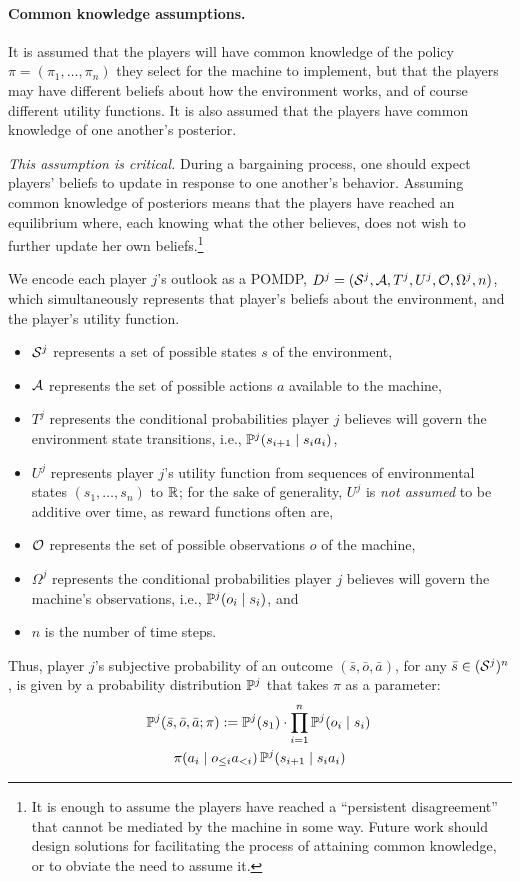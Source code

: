 \documentclass{article}
\newcommand{\seq}{\bar}
\newcommand{\hist}[1]{o_{\le #1}a_{<#1}}
\begin{document}
\paragraph{Common knowledge assumptions.}  It is assumed that the players will have common knowledge of the policy $\pi = (\pi_1,\ldots,\pi_n)$ they select for the machine to implement, but that the players may have different beliefs about how the environment works, and of course different utility functions.  It is also assumed that the players have common knowledge of one another's posterior.  

\emph{This assumption is critical.}  During a bargaining process, one should expect players' beliefs to update in response to one another's behavior.   Assuming common knowledge of posteriors means that the players have reached an equilibrium where, each knowing what the other believes, does not wish to further update her own beliefs.\footnote{It is enough to assume the players have reached a ``persistent disagreement'' that cannot be mediated by the machine in some way.  Future work should design solutions for facilitating the process of attaining common knowledge, or to obviate the need to assume it.}

We encode each player $j$'s outlook as a POMDP, $D^j = (\mathcal{S}^j,\mathcal{A},T^j, U^j, \mathcal{O}, \Omega^j, n)$, which simultaneously represents that player's beliefs about the environment, and the player's utility function.
\begin{itemize}
\item $\mathcal{S}^j$ represents a set of possible states $s$ of the environment,
\item $\mathcal{A}$ represents the set of possible actions $a$ available to the machine,
\item $T^j$ represents the conditional probabilities player $j$ believes will govern the environment state transitions, i.e., $\mathbb{P}^j(s_{i+1}\mid s_i a_i)$,
\item $U^j$ represents player $j$'s utility function from sequences of environmental states $(s_1,\ldots,s_n)$ to $\mathbb{R}$; for the sake of generality, $U^j$ is \emph{not assumed} to be additive over time, as reward functions often are, 
\item $\mathcal{O}$ represents the set of possible observations $o$ of the machine, 
\item $\Omega^j$ represents the conditional probabilities player $j$ believes will govern the machine's observations, i.e., $\mathbb{P}^j(o_i\mid s_i)$, and
\item $n$ is the number of time steps.
\end{itemize}
%
Thus, player $j$'s subjective probability of an outcome $(\seq s, \seq o, \seq a)$, for any $\seq s \in (\Ss^j)^n$, is given by a probability distribution $\mathbb{P}^j$ that takes $\pi$ as a parameter:
\begin{multline}
\label{eqn:pomdp}
\PP^j(\seq s, \seq o, \seq a ; \pi) := \PP^j(s_1) \cdot \prod_{i=1}^{n} 
\PP^j(o_i \mid s_i)\, \\  \pi(a_i \mid \hist i)\, \PP^j(s_{i+1} \mid s_ia_i)
\end{multline}
\end{document}
